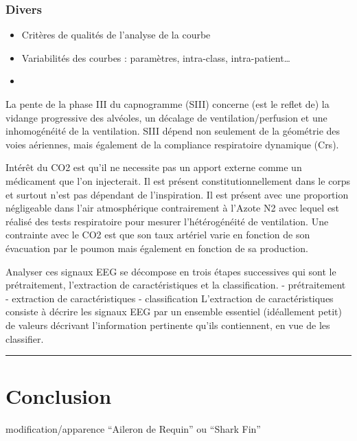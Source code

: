 \documentclass[12pt,]{article}
\begin{document}
\hypertarget{divers}{%
\subsubsection{Divers}\label{divers}}

\begin{itemize}
\item
  Critères de qualités de l'analyse de la courbe
\item
  Variabilités des courbes : paramètres, intra-class,
  intra-patient\ldots{}
\item
\end{itemize}

La pente de la phase III du capnogramme (SIII) concerne (est le reflet
de) la vidange progressive des alvéoles, un décalage de
ventilation/perfusion et une inhomogénéité de la ventilation. SIII
dépend non seulement de la géométrie des voies aériennes, mais également
de la compliance respiratoire dynamique (Crs).

Intérêt du CO2 est qu'il ne necessite pas un apport externe comme un
médicament que l'on injecterait. Il est présent constitutionnellement
dans le corps et surtout n'est pas dépendant de l'inspiration. Il est
présent avec une proportion négligeable dans l'air atmosphérique
contrairement à l'Azote N2 avec lequel est réalisé des tests
respiratoire pour mesurer l'hétérogénéité de ventilation. Une contrainte
avec le CO2 est que son taux artériel varie en fonction de son
évacuation par le poumon mais également en fonction de sa production.

Analyser ces signaux EEG se décompose en trois étapes successives qui
sont le prétraitement, l'extraction de caractéristiques et la
classification. - prétraitement - extraction de caractéristiques -
classification L'extraction de caractéristiques consiste à décrire les
signaux EEG par un ensemble essentiel (idéallement petit) de valeurs
décrivant l'information pertinente qu'ils contiennent, en vue de les
classifier.

\pagebreak

\begin{center}\rule{0.5\linewidth}{\linethickness}\end{center}

\hypertarget{conclusion}{%
\section{Conclusion}\label{conclusion}}

modification/apparence ``Aileron de Requin'' ou ``Shark Fin''
\end{document}
